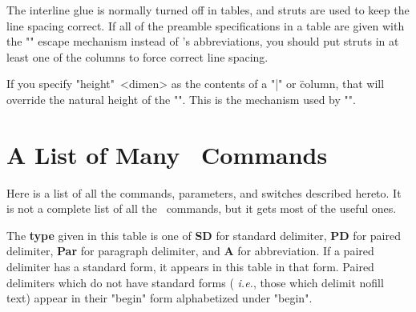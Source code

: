 The interline glue is normally turned off in tables, and struts
are used to keep the line spacing correct.  If all of the
preamble specifications in a table are given with the "{}" escape
mechanism instead of \ytex's abbreviations, you should put struts
in at least one of the columns to force correct line spacing.

If you specify \hbox{"height" <dimen>} as the contents of a "|"
or \" column, that will override the natural height of the
"\vrule".  This is the mechanism used by "\padline".

\section {A List of Many \ytex\ Commands}

Here is a list of all the commands, parameters, and switches
described hereto.  It is not a complete list of all the \ytex\
commands, but it gets most of the useful ones.


The {\bf type} given in this table is one of {\bf SD} for
standard delimiter, {\bf PD} for paired delimiter, {\bf Par} for
paragraph delimiter, and {\bf A} for abbreviation.  If a paired
delimiter has a standard form, it appears in this table in that
form.  Paired delimiters which do not have standard forms ({\it
i.e.}, those which delimit nofill text) appear in their "begin"
form alphabetized under "begin".

\medskip

